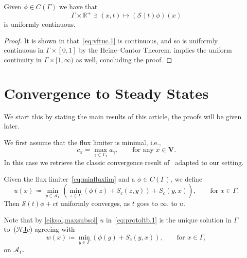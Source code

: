 \documentclass[11pt,a4paper,american]{article}
\newcommand{\Acal}{\mathcal A}
\newcommand{\Hcal}{\mathcal H}
\newcommand{\Rds}{\mathds R}
\newcommand{\Scal}{\mathcal S}
\newcommand{\Vbf}{\mathbf V}
\newcommand{\hrefc}{\textup{(}\hyperref[eq:globeik]{\ensuremath{\Hcal}\textup{J}\ensuremath{c}}\textup{)}}
\begin{document}
    \begin{cor}\label{unifconttsol}
        Given $\phi\in C(\Gamma)$ we have that
        \begin{equation}\label{eq:vftuc.1}
            \Gamma\times\Rds^+\ni(x,t)\longmapsto(\Scal(t)\phi)(x)
        \end{equation}
        is uniformly continuous.
    \end{cor}
    \begin{proof}
        It is shown in \cite[Proposition 6.6]{PozzaSiconolfi23} that~\cref{eq:vftuc.1} is continuous, and so is uniformly continuous in $\Gamma\times[0,1]$ by the Heine--Cantor Theorem.  implies the uniform continuity in $\Gamma\times[1,\infty)$ as well, concluding the proof.
    \end{proof}

    \section{Convergence to Steady States}\label{convsec}

    We start this  by stating the main results of this article, the proofs will be given later.

    We first assume that the flux limiter is minimal, i.e.,
    \begin{equation}\label{eq:minfluxlim}
        c_x=\max_{\gamma\in\Gamma_x}a_\gamma,\qquad\text{for any }x\in\Vbf.
    \end{equation}
    In this case we retrieve the classic convergence result of~\cite{Fathi98} adapted to our setting.

    \begin{theo}\label{protoltb}
        Given the flux limiter~\cref{eq:minfluxlim} and a $\phi\in C(\Gamma)$, we define
        \begin{equation}\label{eq:protoltb.1}
            u(x)\coloneqq\min_{y\in\Acal_\Gamma}\left(\min_{z\in\Gamma}(\phi(z)+S_c(z,y))+S_c(y,x)\right),\qquad\text{for }x\in\Gamma.
        \end{equation}
        Then $\Scal(t)\phi+ct$ uniformly converges, as $t$ goes to $\infty$, to $u$.
    \end{theo}

    Note that by \cref{eiksol,maxsubsol} $u$ in~\cref{eq:protoltb.1} is the unique solution in $\Gamma$ to~\hrefc{} agreeing with
    \begin{equation}\label{eq:protoltb.2}
        w(x)\coloneqq\min\limits_{y\in\Gamma}(\phi(y)+S_c(y,x)),\qquad\text{for }x\in\Gamma,
    \end{equation}
    on $\Acal_\Gamma$.
\end{document}
